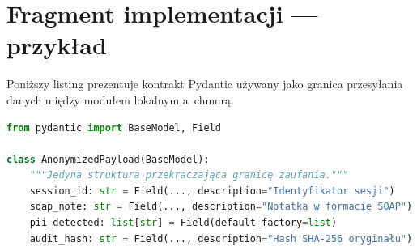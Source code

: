 %
%

\section{Fragment implementacji --- przykład}\label{sec:kod-przyklad}

Poniższy listing prezentuje kontrakt Pydantic używany jako granica
przesyłania danych między modułem lokalnym a~chmurą.

\begin{lstlisting}[language=Python,caption={Kontrakt AnonymizedPayload (uproszczony)},label={lst:payload}]
from pydantic import BaseModel, Field

class AnonymizedPayload(BaseModel):
    """Jedyna struktura przekraczająca granicę zaufania."""
    session_id: str = Field(..., description="Identyfikator sesji")
    soap_note: str = Field(..., description="Notatka w formacie SOAP")
    pii_detected: list[str] = Field(default_factory=list)
    audit_hash: str = Field(..., description="Hash SHA-256 oryginału")
\end{lstlisting}

